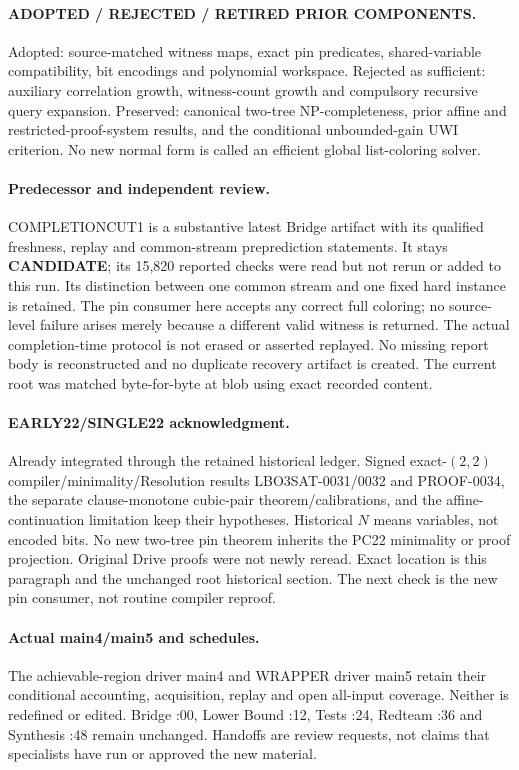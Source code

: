 \documentclass[11pt]{article}
\begin{document}
\paragraph{ADOPTED / REJECTED / RETIRED PRIOR COMPONENTS.}
Adopted: source-matched witness maps, exact pin predicates, shared-variable
compatibility, bit encodings and polynomial workspace. Rejected as sufficient:
auxiliary correlation growth, witness-count growth and compulsory recursive
query expansion. Preserved: canonical two-tree NP-completeness, prior affine
and restricted-proof-system results, and the conditional unbounded-gain UWI
criterion. No new normal form is called an efficient global list-coloring solver.

\paragraph{Predecessor and independent review.}
COMPLETIONCUT1 is a substantive latest Bridge artifact with its qualified
freshness, replay and common-stream preprediction statements. It stays
\textbf{CANDIDATE}; its 15,820 reported checks were read but not rerun or added
to this run. Its distinction between one common stream and one fixed hard
instance is retained. The pin consumer here accepts any correct full coloring;
no source-level failure arises merely because a different valid witness is
returned. The actual completion-time protocol is not erased or asserted
replayed. No missing report body is reconstructed and no duplicate recovery
artifact is created. The current root was matched byte-for-byte at blob
 using exact recorded content.

\paragraph{EARLY22/SINGLE22 acknowledgment.}
Already integrated through the retained historical ledger. Signed
exact-$(2,2)$ compiler/minimality/Resolution results LBO3SAT-0031/0032 and
PROOF-0034, the separate clause-monotone cubic-pair theorem/calibrations,
and the affine-continuation limitation keep their hypotheses. Historical $N$
means variables, not encoded bits. No new two-tree pin theorem inherits the
PC22 minimality or proof projection. Original Drive proofs were not newly
reread. Exact location is this paragraph and the unchanged root historical
section. The next check is the new pin consumer, not routine compiler reproof.

\paragraph{Actual main4/main5 and schedules.}
The achievable-region driver main4 and WRAPPER driver main5 retain their
conditional accounting, acquisition, replay and open all-input coverage.
Neither is redefined or edited. Bridge :00, Lower Bound :12, Tests :24,
Redteam :36 and Synthesis :48 remain unchanged. Handoffs are review requests,
not claims that specialists have run or approved the new material.
\end{document}
